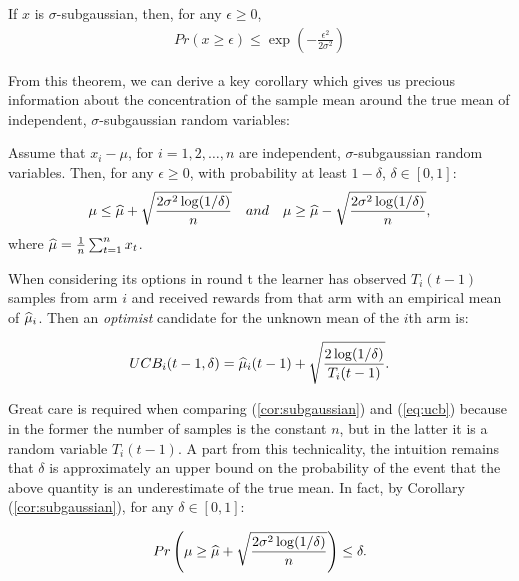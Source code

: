 \begin{theorem} \cite{lattimore2019bandit} 
If $x$ is $\sigma$-subgaussian, then, for any $\epsilon\geq 0$,
\begin{align*}
Pr(x\geq\epsilon)\leq\exp\left(-\frac{\epsilon^2}{2\sigma^2}\right)
\end{align*}
\end{theorem}

From this theorem, we can derive a key corollary which gives us precious information about the concentration of the sample mean around the true mean of independent, $\sigma$-subgaussian random variables: 

\begin{corollary} \label{cor:subgaussian}
Assume that $x_i - \mu$, for $i=1,2,\dots,n$ are independent, $\sigma$-subgaussian random variables. Then, for any $\epsilon\geq 0$, with probability at least $1-\delta$, $\delta\in [0,1]$: 
\begin{align*}
\mu\leq\widehat{\mu}+\sqrt{\frac{2\sigma^2\log(1/\delta)}{n}} \enspace\enspace and \enspace\enspace \mu\geq\widehat{\mu}-\sqrt{\frac{2\sigma^2\log(1/\delta)}{n}},
\end{align*}
where $\widehat{\mu}=\frac{1}{n}\sum_{t=1}^{n}x_t$.
\end{corollary}

When considering its options in round t the learner has observed $T_i(t-1)$ samples from arm $i$ and received rewards from that arm with an empirical mean of $\widehat{\mu}_i$. Then an \emph{optimist} candidate for the unknown mean of the $i$th arm is:

\begin{align} \label{eq:ucb}
UCB_i(t-1, \delta) = \widehat{\mu}_i(t-1) + \sqrt{\frac{2\log(1/\delta)}{T_i(t-1)}}.
\end{align}

Great care is required when comparing (\ref{cor:subgaussian}) and (\ref{eq:ucb}) because in the former the number of samples is the constant $n$, but in the latter it is a random variable
$T_i(t-1)$. A part from this technicality, the intuition remains that $\delta$ is approximately an upper bound on the probability of the event that the above quantity is an underestimate of the true mean. In fact, by Corollary (\ref{cor:subgaussian}), for any $\delta\in [0,1]$:

\begin{align}
Pr\left(\mu\geq\widehat{\mu}+\sqrt{\frac{2\sigma^2\log(1/\delta)}{n}}\right)\leq\delta.
\end{align}

